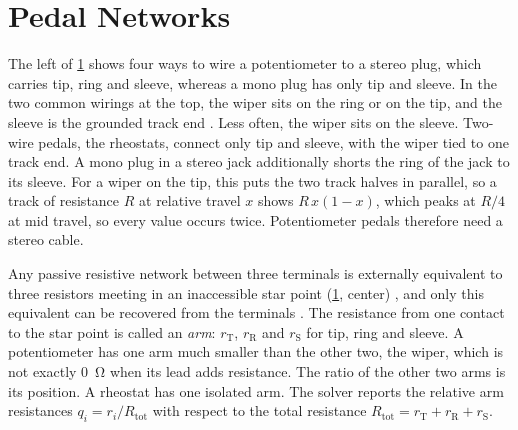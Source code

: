 
\section{Pedal Networks}
\label{sec:network-model}

The left of \cref{fig:principle} shows four ways to wire a potentiometer to a stereo plug, which carries tip, ring and sleeve, whereas a mono plug has only tip and sleeve. In the two common wirings at the top, the wiper sits on the ring or on the tip, and the sleeve is the grounded track end \cite{mission2014expression, nonlinearlabs2026pedals}. Less often, the wiper sits on the sleeve. Two-wire pedals, the rheostats, connect only tip and sleeve, with the wiper tied to one track end. A mono plug in a stereo jack additionally shorts the ring of the jack to its sleeve. For a wiper on the tip, this puts the two track halves in parallel, so a track of resistance $R$ at relative travel $x$ shows $R\,x(1-x)$, which peaks at $R/4$ at mid travel, so every value occurs twice. Potentiometer pedals therefore need a stereo cable.

Any passive resistive network between three terminals is externally equivalent to three resistors meeting in an inaccessible star point (\cref{fig:principle}, center) \cite{kennelly1899equivalence}, and only this equivalent can be recovered from the terminals \cite{borcea2012resistor}. The resistance from one contact to the star point is called an \emph{arm}: $r_\mathrm{T}$, $r_\mathrm{R}$ and $r_\mathrm{S}$ for tip, ring and sleeve. A potentiometer has one arm much smaller than the other two, the wiper, which is not exactly \qty{0}{\ohm} when its lead adds resistance. The ratio of the other two arms is its position. A rheostat has one isolated arm. The solver reports the relative arm resistances $q_i = r_i/R_\mathrm{tot}$ with respect to the total resistance $R_\mathrm{tot} = r_\mathrm{T} + r_\mathrm{R} + r_\mathrm{S}$.

\begin{figure}[tb]
  \centering
  
  \label{fig:principle}
\end{figure}
